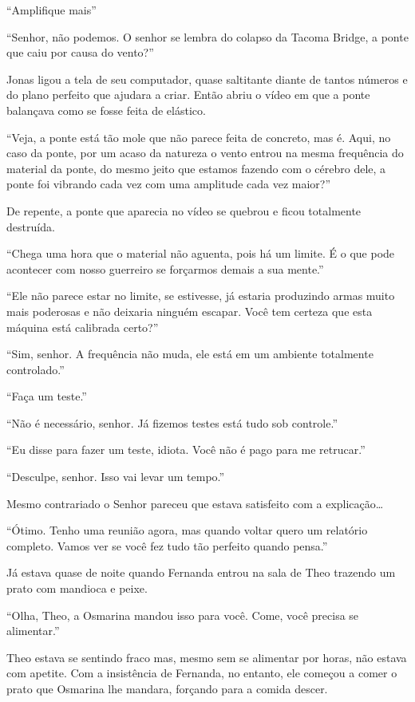 ``Amplifique mais''

``Senhor, não podemos. O senhor se lembra do colapso da Tacoma Bridge, a
ponte que caiu por causa do vento?''

Jonas ligou a tela de seu computador, quase saltitante diante de tantos
números e do plano perfeito que ajudara a criar. Então abriu o vídeo em
que a ponte balançava como se fosse feita de elástico.

``Veja, a ponte está tão mole que não parece feita de concreto, mas é.
Aqui, no caso da ponte, por um acaso da natureza o vento entrou na mesma
frequência do material da ponte, do mesmo jeito que estamos fazendo com
o cérebro dele, a ponte foi vibrando cada vez com uma amplitude cada vez
maior?''

De repente, a ponte que aparecia no vídeo se quebrou e ficou totalmente
destruída.

``Chega uma hora que o material não aguenta, pois há um limite. É o que
pode acontecer com nosso guerreiro se forçarmos demais a sua mente.''

``Ele não parece estar no limite, se estivesse, já estaria produzindo
armas muito mais poderosas e não deixaria ninguém escapar. Você tem
certeza que esta máquina está calibrada certo?''

``Sim, senhor. A frequência não muda, ele está em um ambiente totalmente
controlado.''

``Faça um teste.''

``Não é necessário, senhor. Já fizemos testes está tudo sob controle.''

``Eu disse para fazer um teste, idiota. Você não é pago para me
retrucar.''

``Desculpe, senhor. Isso vai levar um tempo.''

Mesmo contrariado o Senhor  pareceu que estava satisfeito com a
explicação\ldots{}

``Ótimo. Tenho uma reunião agora, mas quando voltar quero um relatório
completo. Vamos ver se você fez tudo tão perfeito quando pensa.''

\asterisc


Já estava quase de noite quando Fernanda entrou na sala de Theo trazendo
um prato com mandioca e peixe.

``Olha, Theo, a Osmarina mandou isso para você. Come, você precisa se
alimentar.''

Theo estava se sentindo fraco mas, mesmo sem se alimentar por horas, não
estava com apetite. Com a insistência de Fernanda, no entanto, ele
começou a comer o prato que Osmarina lhe mandara, forçando para a comida
descer.

